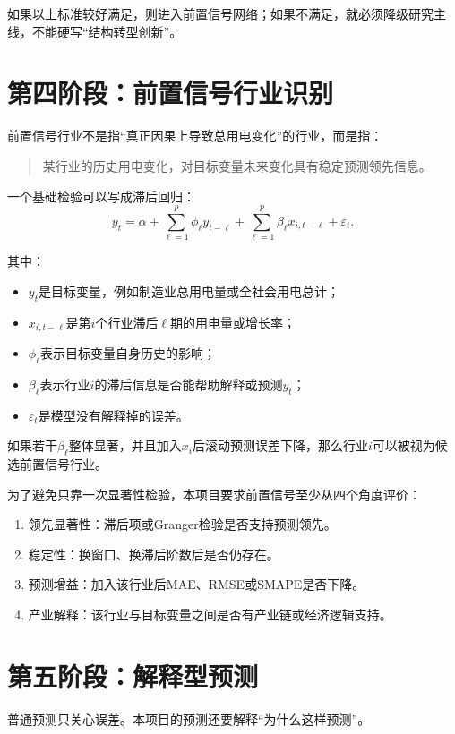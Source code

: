 \documentclass[UTF8,a4paper,11pt]{ctexart}
\begin{document}
如果以上标准较好满足，则进入前置信号网络；如果不满足，就必须降级研究主线，不能硬写“结构转型创新”。

\section{第四阶段：前置信号行业识别}

前置信号行业不是指“真正因果上导致总用电变化”的行业，而是指：

\begin{quote}
某行业的历史用电变化，对目标变量未来变化具有稳定预测领先信息。
\end{quote}

一个基础检验可以写成滞后回归：
\[
y_t
=
\alpha
+
\sum_{\ell=1}^{p}\phi_{\ell}y_{t-\ell}
+
\sum_{\ell=1}^{p}\beta_{\ell}x_{i,t-\ell}
+
\varepsilon_t.
\]

其中：
\begin{itemize}
  \item $y_t$是目标变量，例如制造业总用电量或全社会用电总计；
  \item $x_{i,t-\ell}$是第$i$个行业滞后$\ell$期的用电量或增长率；
  \item $\phi_{\ell}$表示目标变量自身历史的影响；
  \item $\beta_{\ell}$表示行业$i$的滞后信息是否能帮助解释或预测$y_t$；
  \item $\varepsilon_t$是模型没有解释掉的误差。
\end{itemize}

如果若干$\beta_{\ell}$整体显著，并且加入$x_i$后滚动预测误差下降，那么行业$i$可以被视为候选前置信号行业。

为了避免只靠一次显著性检验，本项目要求前置信号至少从四个角度评价：
\begin{enumerate}
  \item 领先显著性：滞后项或Granger检验是否支持预测领先。
  \item 稳定性：换窗口、换滞后阶数后是否仍存在。
  \item 预测增益：加入该行业后MAE、RMSE或SMAPE是否下降。
  \item 产业解释：该行业与目标变量之间是否有产业链或经济逻辑支持。
\end{enumerate}

\section{第五阶段：解释型预测}

普通预测只关心误差。本项目的预测还要解释“为什么这样预测”。
\end{document}
